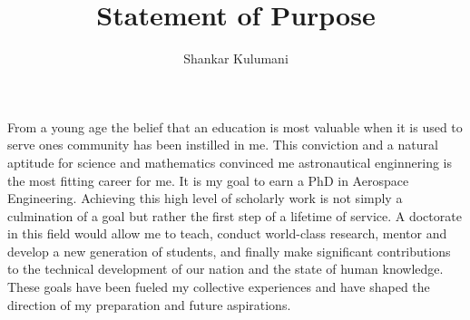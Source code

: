\documentclass[12pt, oneside]{article}   	%
\title{Statement of Purpose}
\author{Shankar Kulumani}
\date{}							%
\begin{document}
\maketitle

\begin{comment}
On the first day of Astro 310, the introductory astronautics course at the US Air Force Academy, my professor asked bluntly, ``What have you learned so far?''
Some stated that they knew trigonometry; to which the professor replied `` Well, that brings you up to about the year 300 B.C.''
Another would reply that we had all learned calculus as well, which would be answered with another equally blunt statement of ``You're now all the way to about the 1700s.''
It was at this point where I finally realized that the wave of human knowledge continually moves forward and I want to lead it.
My goal is to obtain a PhD in Aerospace Engineering and attempt to contribute to the field in the same manner as all those who have come before me.
 \end{comment}

From a young age the belief that an education is most valuable when it is used to serve ones community has been instilled in me. 
This conviction and a natural aptitude for science and mathematics convinced me astronautical enginnering is the most fitting career for me.
It is my goal to earn a PhD in Aerospace Engineering.
Achieving this high level of scholarly work is not simply a culmination of a goal but rather the first step of a lifetime of service. 
A doctorate in this field would allow me to teach, conduct world-class research, mentor and develop a new generation of students, and finally make significant contributions to the technical development of our nation and the state of human knowledge.
These goals have been fueled my collective experiences and have shaped the direction of my preparation and future aspirations.
\end{document}
